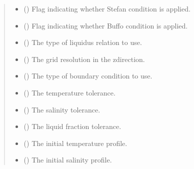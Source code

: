 \documentclass[a4paper,11pt,english,openany]{sphinxmanual}
\begin{document}
\begin{fulllineitems}
\begin{quote}
\begin{description}
\begin{itemize}
\item {} 
\sphinxAtStartPar
{} () \textendash{} Flag indicating whether Stefan condition is applied.

\item {} 
\sphinxAtStartPar
{} () \textendash{} Flag indicating whether Buffo condition is applied.

\item {} 
\sphinxAtStartPar
{} () \textendash{} The type of liquidus relation to use.

\item {} 
\sphinxAtStartPar
{} () \textendash{} The grid resolution in the z\sphinxhyphen{}direction.

\item {} 
\sphinxAtStartPar
{} () \textendash{} The type of boundary condition to use.

\item {} 
\sphinxAtStartPar
{} () \textendash{} The temperature tolerance.

\item {} 
\sphinxAtStartPar
{} () \textendash{} The salinity tolerance.

\item {} 
\sphinxAtStartPar
{} () \textendash{} The liquid fraction tolerance.

\item {} 
\sphinxAtStartPar
{} () \textendash{} The initial temperature profile.

\item {} 
\sphinxAtStartPar
{} () \textendash{} The initial salinity profile.


\end{itemize}
\end{description}
\end{quote}
\end{fulllineitems}
\end{document}
